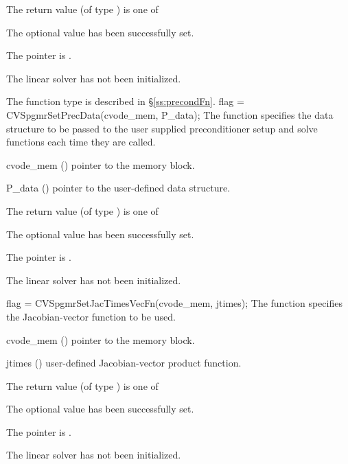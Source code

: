 {
  The return value  (of type ) is one of
  \begin{args}
  \item[\Id{CVSPGMR\_SUCCESS}] 
    The optional value has been successfully set.
  \item[\Id{CVSPGMR\_MEM\_NULL}]
    The  pointer is .
  \item[\Id{CVSPGMR\_LMEM\_NULL}]
    The {\cvspgmr} linear solver has not been initialized.
  \end{args}
}
{
   The function type  is described in \S\ref{ss:precondFn}.
}
{
  flag = CVSpgmrSetPrecData(cvode\_mem, P\_data);
}
{
  The function  specifies the data structure
  to be passed to the user supplied preconditioner setup and solve
  functions each time they are called.
}
{
  \begin{args}
  \item[cvode\_mem] ()
    pointer to the {\cvode} memory block.
  \item[P\_data] ()
     pointer to the user-defined data structure.
  \end{args}
}
{
  The return value  (of type ) is one of
  \begin{args}
  \item[\Id{CVSPGMR\_SUCCESS}] 
    The optional value has been successfully set.
  \item[\Id{CVSPGMR\_MEM\_NULL}]
    The  pointer is .
  \item[\Id{CVSPGMR\_LMEM\_NULL}]
    The {\cvspgmr} linear solver has not been initialized.
  \end{args}
}
{}
{
  flag = CVSpgmrSetJacTimesVecFn(cvode\_mem, jtimes);
}
{
  The function  specifies the Jacobian-vector 
  function to be used.
}
{
  \begin{args}
  \item[cvode\_mem] ()
    pointer to the {\cvode} memory block.
  \item[jtimes] ()
    user-defined Jacobian-vector product function.
  \end{args}
}
{
  The return value  (of type ) is one of
  \begin{args}
  \item[\Id{CVSPGMR\_SUCCESS}] 
    The optional value has been successfully set.
  \item[\Id{CVSPGMR\_MEM\_NULL}]
    The  pointer is .
  \item[\Id{CVSPGMR\_LMEM\_NULL}]
    The {\cvspgmr} linear solver has not been initialized.
  \end{args}
}
